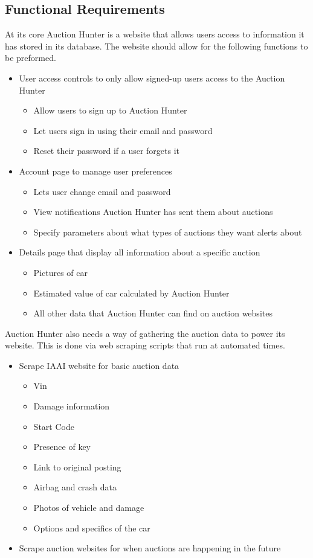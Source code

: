 \documentclass[onecolumn, draftclsnofoot,10pt, compsoc]{IEEEtran}
\begin{document}
\subsection{Functional Requirements}
At its core Auction Hunter is a website that allows users access to information it has stored in its database. The website should allow for the following functions to be preformed.

\begin{itemize}
\item User access controls to only allow signed-up users access to the Auction Hunter
\begin{itemize}
    \item Allow users to sign up to Auction Hunter
    \item Let users sign in using their email and password
    \item Reset their password if a user forgets it
\end{itemize}
\item Account page to manage user preferences
\begin{itemize}
    \item Lets user change email and password
    \item View notifications Auction Hunter has sent them about auctions
    \item Specify parameters about what types of auctions they want alerts about
\end{itemize}
\item Details page that display all information about a specific auction
\begin{itemize}
    \item Pictures of car
    \item Estimated value of car calculated by Auction Hunter
    \item All other data that Auction Hunter can find on auction websites
\end{itemize}
\end{itemize}

Auction Hunter also needs a way of gathering the auction data to power its website. This is done via web scraping scripts that run at automated times.

\begin{itemize}
    \item Scrape IAAI website for basic auction data
    \begin{itemize}
        \item Vin
        \item Damage information
        \item Start Code
        \item Presence of key
        \item Link to original posting
        \item Airbag and crash data
        \item Photos of vehicle and damage
        \item Options and specifics of the car
    \end{itemize}
    \item Scrape auction websites for when auctions are happening in the future
\end{itemize}
\end{document}
